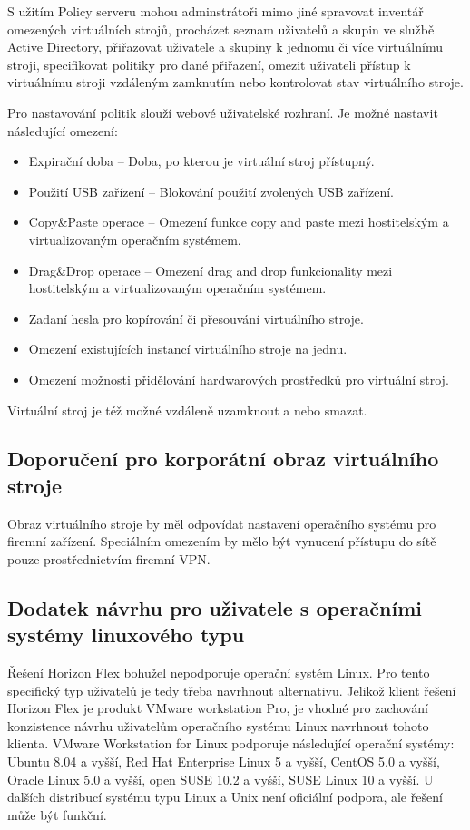 S užitím Policy serveru mohou adminstrátoři mimo jiné spravovat inventář omezených virtuálních strojů, procházet seznam uživatelů a skupin ve službě Active Directory, přiřazovat uživatele a skupiny k jednomu či více virtuálnímu stroji, specifikovat politiky pro dané přiřazení, omezit uživateli přístup k virtuálnímu stroji vzdáleným zamknutím nebo kontrolovat stav virtuálního stroje.

Pro nastavování politik slouží webové uživatelské rozhraní. Je možné nastavit následující omezení:

\begin{itemize}
    \item Expirační doba -- Doba, po kterou je virtuální stroj přístupný.
    \item Použití USB zařízení -- Blokování použití zvolených USB zařízení.
    \item Copy\&Paste operace -- Omezení funkce copy and paste mezi hostitelským a virtualizovaným operačním systémem.
    \item Drag\&Drop operace -- Omezení drag and drop funkcionality mezi hostitelským a virtualizovaným operačním systémem.
    \item Zadaní hesla pro kopírování či přesouvání virtuálního stroje.
    \item Omezení existujících instancí virtuálního stroje na jednu.
    \item Omezení možnosti přidělování hardwarových prostředků pro virtuální stroj.
\end{itemize}

Virtuální stroj je též možné vzdáleně uzamknout a nebo smazat.

\subsection{Doporučení pro korporátní obraz virtuálního stroje}
Obraz virtuálního stroje by měl odpovídat nastavení operačního systému pro firemní zařízení. Speciálním omezením by mělo být vynucení přístupu do sítě pouze prostřednictvím firemní VPN.

\subsection{Dodatek návrhu pro uživatele s operačními systémy linuxového typu}
Řešení Horizon Flex bohužel nepodporuje operační systém Linux. Pro tento specifický typ uživatelů je tedy třeba navrhnout alternativu. Jelikož klient řešení Horizon Flex je produkt VMware workstation Pro, je vhodné pro zachování konzistence návrhu uživatelům operačního systému Linux navrhnout tohoto klienta. VMware Workstation for Linux podporuje následující operační systémy: Ubuntu 8.04 a vyšší, Red Hat Enterprise Linux 5 a vyšší, CentOS 5.0 a vyšší, Oracle Linux 5.0 a vyšší, open SUSE 10.2 a vyšší, SUSE Linux 10 a vyšší. U dalších distribucí systému typu Linux a Unix není oficiální podpora, ale řešení může být funkční.

